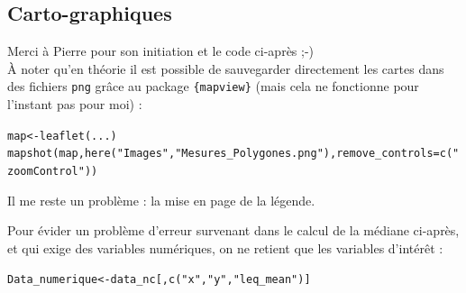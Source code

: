 \documentclass[11pt]{article}\usepackage[]{graphicx}\usepackage[]{color}
\makeatletter
\newcommand{\hlstr}[1]{\textcolor[rgb]{0.063,0.58,0.627}{#1}}%
\newcommand{\hlstd}[1]{\textcolor[rgb]{0.196,0.196,0.196}{#1}}%
\newcommand{\hlkwb}[1]{\textcolor[rgb]{0.627,0,0.314}{#1}}%
\newcommand{\hlkwc}[1]{\textcolor[rgb]{0,0.631,0.314}{#1}}%
\newcommand{\hlkwd}[1]{\textcolor[rgb]{0.78,0.227,0.412}{#1}}%
\newenvironment{kframe}{%
 \def\at@end@of@kframe{}%
 \ifinner\ifhmode%
  \def\at@end@of@kframe{\end{minipage}}%
  \begin{minipage}{\columnwidth}%
 \fi\fi%
 \def\FrameCommand##1{\hskip\@totalleftmargin \hskip-\fboxsep
 \colorbox{shadecolor}{##1}\hskip-\fboxsep
     \hskip-\linewidth \hskip-\@totalleftmargin \hskip\columnwidth}%
 \MakeFramed {\advance\hsize-\width
   \@totalleftmargin\z@ \linewidth\hsize
   \@setminipage}}%
 {\par\unskip\endMakeFramed%
 \at@end@of@kframe}
\newenvironment{knitrout}{}{} %
\newcommand{\type}[1]{\textcolor{RedOrange}{\texttt{#1}}}
\makeatother
\begin{document}
\begin{center}
\end{center}


\subsection{Carto-graphiques}

Merci à Pierre pour son initiation et le code ci-après ;-)\\[1ex]

À noter qu'en théorie il est possible de sauvegarder directement les cartes dans des fichiers \type{png} grâce au package \type{\{mapview\}} (mais cela ne fonctionne pour l'instant pas pour moi)  :
\begin{knitrout}\footnotesize
{}\color{fgcolor}\begin{kframe}
\begin{alltt}
\hlstd{map} \hlkwb{<-} \hlkwd{leaflet}\hlstd{(...)}
\hlkwd{mapshot}\hlstd{(map,} \hlkwd{here}\hlstd{(}\hlstr{"Images"}\hlstd{,}\hlstr{"Mesures_Polygones.png"}\hlstd{),}\hlkwc{remove_controls} \hlstd{=} \hlkwd{c}\hlstd{(}\hlstr{"zoomControl"}\hlstd{))}
\end{alltt}
\end{kframe}
\end{knitrout}

Il me reste un problème : la mise en page de la légende.

Pour évider un problème d'erreur survenant dans le calcul de la médiane ci-après, et qui exige des variables numériques, on ne retient que les variables d'intérêt :
\begin{knitrout}\footnotesize
{}\color{fgcolor}\begin{kframe}
\begin{alltt}
\hlstd{Data_numerique} \hlkwb{<-} \hlstd{data_nc[,}\hlkwd{c}\hlstd{(}\hlstr{"x"}\hlstd{,}\hlstr{"y"}\hlstd{,}\hlstr{"leq_mean"}\hlstd{)]}
\end{alltt}
\end{kframe}
\end{knitrout}
\end{document}
